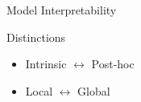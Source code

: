 \documentclass[ignorenonframetext,xcolor=x11names]{beamer}
\begin{document}
\begin{frame}[label=full]{Model Interpretability}
\begin{block}{Distinctions}
\begin{itemize}
   \item Intrinsic $\leftrightarrow$ Post-hoc
   \item Local $\leftrightarrow$ Global
\end{itemize}
\end{block}
\end{frame}

\end{document}
